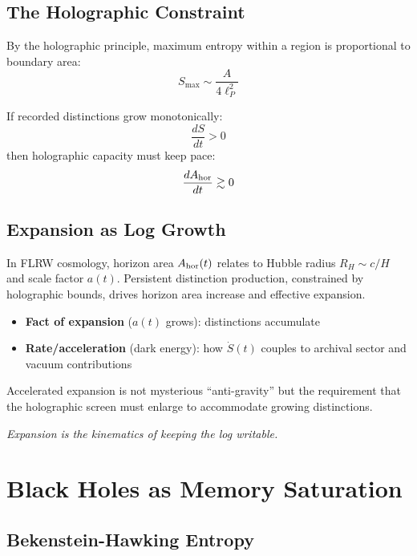 \documentclass[12pt,a4paper]{article}
\begin{document}
\subsection{The Holographic Constraint}

By the holographic principle, maximum entropy within a region is proportional to boundary area:
\begin{equation}
    S_{\max} \sim \frac{A}{4\ell_P^2}
\end{equation}

If recorded distinctions grow monotonically:
\begin{equation}
    \frac{dS}{dt} > 0
\end{equation}
then holographic capacity must keep pace:
\begin{equation}
    \frac{dA_{\rm hor}}{dt} \gtrsim 0
\end{equation}

\subsection{Expansion as Log Growth}

In FLRW cosmology, horizon area $A_{\rm hor}(t)$ relates to Hubble radius $R_H \sim c/H$ and scale factor $a(t)$. Persistent distinction production, constrained by holographic bounds, drives horizon area increase and effective expansion.

\begin{itemize}
    \item \textbf{Fact of expansion} ($a(t)$ grows): distinctions accumulate
    \item \textbf{Rate/acceleration} (dark energy): how $\dot{S}(t)$ couples to archival sector and vacuum contributions
\end{itemize}

Accelerated expansion is not mysterious ``anti-gravity'' but the requirement that the holographic screen must enlarge to accommodate growing distinctions.

\begin{center}
\emph{Expansion is the kinematics of keeping the log writable.}
\end{center}

\section{Black Holes as Memory Saturation}

\subsection{Bekenstein-Hawking Entropy}
\end{document}
